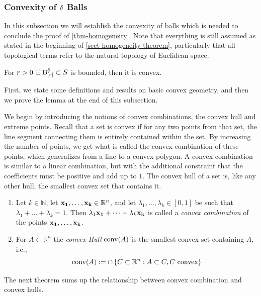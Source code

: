 \subsubsection{Convexity of $\operatorname{\delta}$ Balls} \label{sec-ball-convexity}
In this subsection we will establish the convexity of balls which is needed to conclude the proof of \cref{thm-homogeneity}. 
Note that everything is still assumed as stated in the beginning of \cref{sect-homogeneity-theorem}, particularly that all topological terms refer to the natural topology of Euclidean space.

\begin{lem} \label{lem-metr-spheres-convex}
	For $r> 0$ if $\operatorname{B}^{\operatorname{\delta}}_{[r]} \subset S$ is bounded, then it is convex.
\end{lem}
First, we state some definitions and results on basic convex geometry, and then we prove the lemma at the end of this subsection.

We begin by introducing the notions of convex combinations, the convex hull and extreme points.
Recall that a set is convex if for any two points from that set, the line segment connecting them is entirely contained within the set. By increasing the number of points, we get what is called the convex combination of these points, which generalizes from a line to a convex polygon. A convex combination is similar to a linear combination, but with the additional constraint that the coefficients must be positive and add up to $1$. The convex hull of a set is, like any other hull, the smallest convex set that contains it.

\begin{defi} \label{def-conv-and-comb-hull}
	\leavevmode \vspace{-\baselineskip}
	\begin{enumerate}
    \item Let $k \in \mathbb{N}$, let $\mathbf{x_1}, \dots, \mathbf{x_k} \in \mathbb{R}^{n}$, and let $\lambda_1, \dots, \lambda_k \in [0,1]$ be such that $\lambda_1 + \dots + \lambda_k = 1$. Then $\lambda_1 \mathbf{x_1} + \dots + \lambda_k \mathbf{x_k}$ is called a \emph{convex combination} of the points $\mathbf{x_1}, \dots, \mathbf{x_k}$. 
    \item For $A \subset \mathbb{R}^{n}$ the \emph{convex Hull} $\operatorname{conv}(A)$ is the smallest convex set containing $A$, i.e., $$\operatorname{conv}(A) := \cap \left \{ C \subset \mathbb{R}^n:A \subset C,  C \text{ convex} \right \}$$  %
	\end{enumerate}
\end{defi}
The next theorem sums up the relationship between convex combination and convex hulls.

